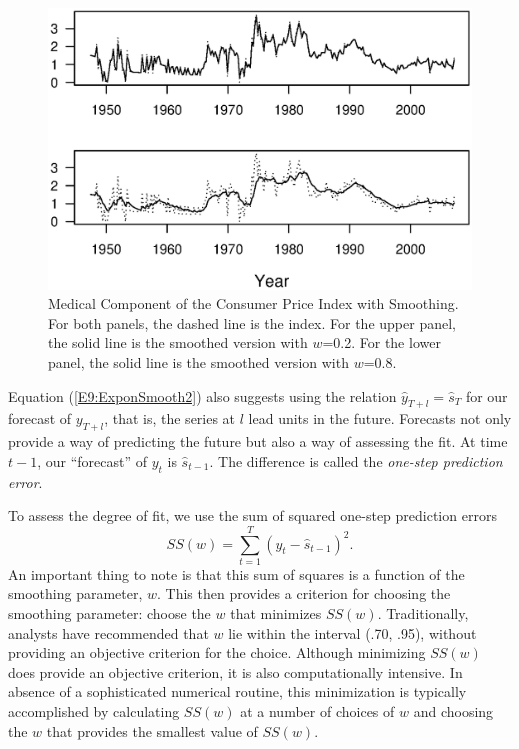 \begin{figure}[htp]
  \begin{center}
    \includegraphics[width=1\textwidth]
     {Chapter9Forecasting/MCPIESmooth.eps}
    \caption{\label{F9:MCPIESmooth} \small Medical
Component of the Consumer Price Index with Smoothing. For both
panels, the dashed line is the index. For the upper panel, the solid
line is the smoothed version with $w$=0.2. For the lower panel, the
solid line is the smoothed version with $w$=0.8.}
  \end{center}
\end{figure}

\linejed

\bigskip

Equation (\ref{E9:ExponSmooth2}) also suggests using the relation
$\widehat{y}_{T+l} = \widehat{s}_T$ for our forecast of $y_{T+l}$,
that is, the series at $l$ lead units in the future. Forecasts not
only provide a way of predicting the future but also a way of
assessing the fit. At time $t-1$, our ``forecast'' of $y_t$ is
$\widehat{s}_{t-1}$. The difference is called the \emph{one-step
prediction error}.

To assess the degree of fit, we use the sum of squared one-step
prediction errors
\begin{equation}
SS\left( w\right) = \sum_{t=1}^T \left( y_t - \widehat{s}_{t-1}
\right)^2.
\end{equation}
An important thing to note is that this sum of squares is a function of the
smoothing parameter, $w$. This then provides a criterion for choosing the
smoothing parameter: choose the $w$ that minimizes $SS\left( w\right) $.
Traditionally, analysts have recommended that $w$ lie within the interval
(.70, .95), without providing an objective criterion for the choice.
Although minimizing $SS\left( w\right) $ does provide an objective
criterion, it is also computationally intensive. In absence of a
sophisticated numerical routine, this minimization is typically accomplished
by calculating $SS\left( w\right) $ at a number of choices of $w$ and
choosing the $w$ that provides the smallest value of $SS\left( w\right) $.

